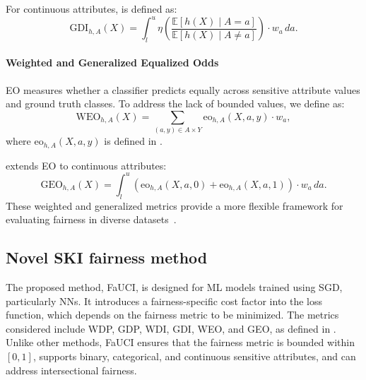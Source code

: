 For continuous attributes,  is defined as:
%
\begin{equation}
    \label{eq:gdi}
    \text{GDI}_{h,A}(X) = \int_{l}^{u} \eta \left( \frac{\mathbb{E}[h(X) \mid A = a]}{\mathbb{E}[h(X) \mid A \neq a]} \right) \cdot w_a \, da.
\end{equation}


\paragraph{Weighted and Generalized Equalized Odds}
%
\Gls{EO} measures whether a classifier predicts equally across sensitive attribute values and ground truth classes.
%
To address the lack of bounded values, we define  as:
%
\begin{equation}
    \label{eq:weo}
    \text{WEO}_{h,A}(X) = \sum_{(a, y) \in A \times Y} \text{eo}_{h,A}(X, a, y) \cdot w_a,
\end{equation}
%
where \( \text{eo}_{h,A}(X, a, y) \) is defined in .


 extends \gls{EO} to continuous attributes:
%
\begin{equation}
    \label{eq:geo}
    \text{GEO}_{h,A}(X) = \int_{l}^{u} \left( \text{eo}_{h,A}(X, a, 0) + \text{eo}_{h,A}(X, a, 1) \right) \cdot w_a \, da.
\end{equation}
%
These weighted and generalized metrics provide a more flexible framework for evaluating fairness in diverse datasets~\cite{placeholder}.



\subsection{Novel SKI fairness method}\label{subsec:novel-fairness-method}
%
The proposed method, \gls{FaUCI}, is designed for \gls{ML} models trained using \gls{SGD}, particularly \glspl{NN}.
%
It introduces a fairness-specific cost factor into the loss function, which depends on the fairness metric to be minimized.
%
The metrics considered include \gls{WDP}, \gls{GDP}, \gls{WDI}, \gls{GDI}, \gls{WEO}, and \gls{GEO}, as defined in .
%
Unlike other methods, \gls{FaUCI} ensures that the fairness metric is bounded within \([0, 1]\), supports binary, categorical, and continuous sensitive attributes, and can address intersectional fairness.

